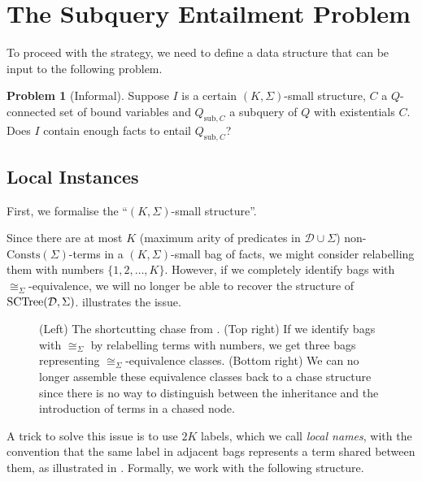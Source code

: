 \documentclass[12pt]{report}
\theoremstyle{plain}
\theoremstyle{definition}
\newtheorem{problem}[theorem]{Problem}
\def\Consts{{\mathrm{Consts}}}
\newcommand{\SCTree}[2]{\ensuremath{\normalfont{\textrm{SCTree}}\!\left( #1, #2 \right)}}
\begin{document}
\section{The Subquery Entailment Problem}
\label{section:subquery-entailment-problem}

To proceed with the strategy, we need to define a data structure that can be input to the following problem.

\begin{problem}[Informal]
\label{problem:informal-subquery-entailment}
  Suppose $I$ is a certain $(K, \Sigma)$-small structure, $C$ a $Q$-connected set of bound variables and $Q_{\mathrm{sub}, C}$ a subquery of $Q$ with existentials $C$. Does $I$ contain enough facts to entail $Q_{\mathrm{sub}, C}$?
\end{problem}

\subsection{Local Instances}
\label{subsection:local-instances}

First, we formalise the ``$(K, \Sigma)$-small structure''.

Since there are at most $K$ (maximum arity of predicates in $\mathcal{D} \cup \Sigma$) non-$\Consts(\Sigma)$-terms in a $(K, \Sigma)$-small bag of facts, we might consider relabelling them with numbers $\{ 1, 2, \ldots, K \}$. However, if we completely identify bags with $\cong_\Sigma$-equivalence, we will no longer be able to recover the structure of $\SCTree{\mathcal{D}}{\Sigma}$.  illustrates the issue.

\begin{figure}[ht]
  \centering
  
  \caption{(Left) The shortcutting chase from . (Top right) If we identify bags with $\cong_\Sigma$ by relabelling terms with numbers, we get three bags representing $\cong_\Sigma$-equivalence classes. (Bottom right) We can no longer assemble these equivalence classes back to a chase structure since there is no way to distinguish between the inheritance and the introduction of terms in a chased node.}
  \label{figure:sctree-simple-example-equivalence-classes}
\end{figure}

A trick to solve this issue is to use $2K$ labels, which we call \emph{local names}, with the convention that the same label in adjacent bags represents a term shared between them, as illustrated in . Formally, we work with the following structure.
\end{document}
